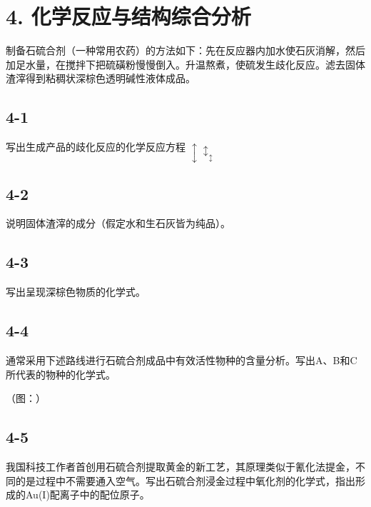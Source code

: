 \section*{4. 化学反应与结构综合分析}
制备⽯硫合剂（⼀种常⽤农药）的⽅法如下：先在反应器内加⽔使⽯灰消解，然后加⾜⽔量，在搅拌下把硫磺粉慢慢倒⼊。升温熬煮，使硫发⽣歧化反应。滤去固体渣滓得到粘稠状深棕⾊透明碱性液体成品。

\subsection*{4-1}
写出⽣成产品的歧化反应的化学反应⽅程 $\updownarrow \updownarrow _ { \updownarrow }$

\subsection*{4-2}
说明固体渣滓的成分（假定⽔和⽣⽯灰皆为纯品）。

\subsection*{4-3}
写出呈现深棕⾊物质的化学式。

\subsection*{4-4}
通常采⽤下述路线进⾏⽯硫合剂成品中有效活性物种的含量分析。写出A、B和C所代表的物种的化学式。

（图：）

\subsection*{4-5}
我国科技⼯作者⾸创⽤⽯硫合剂提取⻩⾦的新⼯艺，其原理类似于氰化法提⾦，不同的是过程中不需要通⼊空⽓。写出⽯硫合剂浸⾦过程中氧化剂的化学式，指出形成的Au(I)配离⼦中的配位原⼦。
